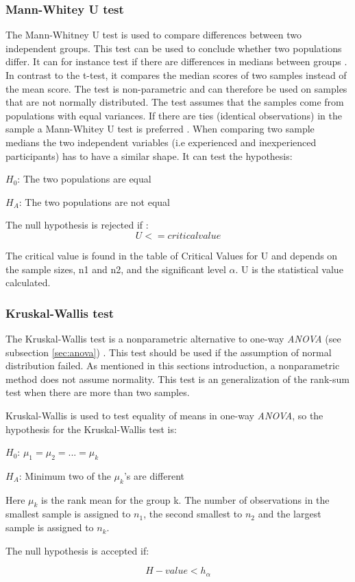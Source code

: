 \subsubsection{Mann-Whitey U test}\label{sec:mannwhiteyu}
The Mann-Whitney U test is used to compare differences between two independent groups. This test can be used to conclude whether two populations differ. It can for instance test if there are differences in medians between groups \citep{LundResearchLtd2013b}. In contrast to the t-test, it compares the median scores of two samples instead of the mean score. The test is non-parametric and can therefore be used on samples that are not normally distributed. The test assumes that the samples come from populations with equal variances. If there are ties (identical observations) in the sample a Mann-Whitey U test is preferred \citep{TheScipycommunity2017}.  When comparing two sample medians the two independent variables (i.e experienced and inexperienced participants) has to have a similar shape. It can test the hypothesis: \\

\centerline{$H_{0}$: The two populations are equal} 
\centerline{$H_{A}$: The two populations are not equal}

The null hypothesis is rejected if \citep{LaMorte2017}: \\

\begin{equation}
\label{eq:mannwhitey-ciritcalvalue}
U <= critical value
\end{equation}

The critical value is found in the table of Critical Values for U and depends on the sample sizes, n1 and n2, and the significant level $\alpha$. U is the statistical value calculated. 

\subsubsection[Kruskal]{Kruskal-Wallis test}\label{sec:kruskal-w-test}
The Kruskal-Wallis test is a nonparametric alternative to one-way \textit{ANOVA} (see subsection \ref{sec:anova})  \citep{Walpole2012}. This test should be used if the assumption of normal distribution failed. As mentioned in this sections introduction, a nonparametric method does not assume normality. This test is an generalization of the rank-sum test when there are more than two samples.

Kruskal-Wallis is used to test equality of means in one-way \textit{ANOVA}, so the hypothesis for the Kruskal-Wallis test is:\newline

\centerline{$H_{0}$:  $\mu_{1} =  \mu_{2} = ... = \mu_{k} $} 
\centerline{$H_{A}$: Minimum two of the $\mu_{k}$'s are different}

Here $\mu_{k}$ is the rank mean for the group k. The number of observations in the smallest sample is assigned to $n_1$, the second smallest to $n_2$ and the largest sample is assigned to $n_k$. 

The null hypothesis is accepted if: 

\begin{equation}
\label{eq:kruskapw-accept}
H-value < h_{\alpha}
\end{equation}